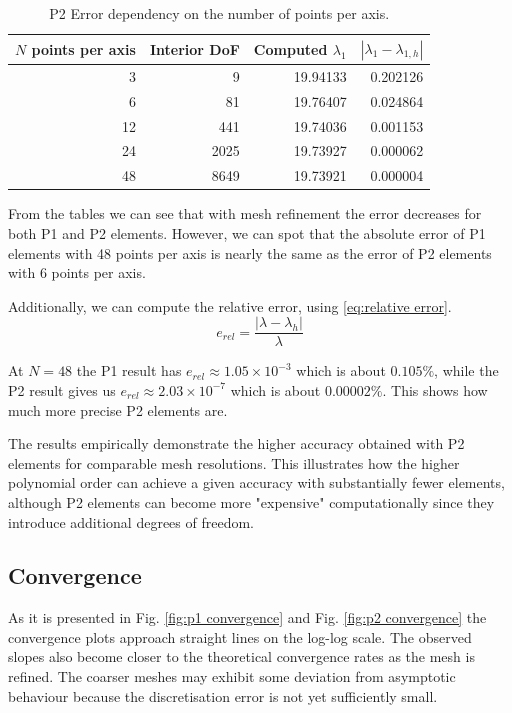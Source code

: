 \documentclass[conference]{IEEEtran}
\begin{document}
\begin{table}[H]
    \centering
    \caption{P2 Error dependency on the number of points per axis.}
    \label{tab:P2 error dependency}
    \begin{tabular}{rrrr}
        \toprule
        $N$ points per axis & Interior DoF & Computed $\lambda_1$ & $|\lambda_1 - \lambda_{1,h}|$ \\
        \midrule
        3 & 9 & 19.94133 & 0.202126 \\
        6 & 81 & 19.76407 & 0.024864 \\
        12 & 441 & 19.74036 & 0.001153 \\
        24 & 2025 & 19.73927 & 0.000062 \\
        48 & 8649 & 19.73921 & 0.000004 \\
        \bottomrule
    \end{tabular}
\end{table}

From the tables we can see that with mesh refinement the error decreases for both P1 and P2 elements. However, we can spot that the absolute error of P1 elements with 48 points per axis is nearly the same as the error of P2 elements with 6 points per axis.

Additionally, we can compute the relative error, using \ref{eq:relative error}.
\begin{equation}
    e_{rel} = \frac{|\lambda - \lambda_h|}{\lambda}
    \label{eq:relative error}
\end{equation}

At $N = 48$ the P1 result has $e_{rel} \approx 1.05 \times 10^{-3}$ which is about $0.105\%$, while the P2 result gives us $e_{rel} \approx 2.03 \times 10^{-7}$ which is about $0.00002\%$. This shows how much more precise P2 elements are.

The results empirically demonstrate the higher accuracy obtained with P2 elements for comparable mesh resolutions. This illustrates how the higher polynomial order can achieve a given accuracy with substantially fewer elements, although P2 elements can become more "expensive" computationally since they introduce additional degrees of freedom.


\subsection{Convergence}
As it is presented in Fig. \ref{fig:p1 convergence} and Fig. \ref{fig:p2 convergence} the convergence plots approach straight lines on the log-log scale. The observed slopes also become closer to the theoretical convergence rates as the mesh is refined. 
The coarser meshes may exhibit some deviation from asymptotic behaviour because the discretisation error is not yet sufficiently small.
\end{document}
